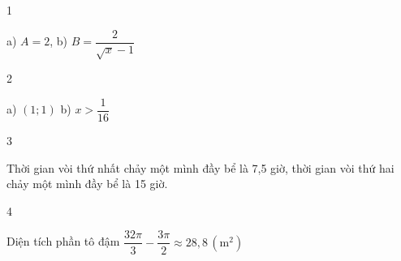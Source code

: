 \begin{Solbook}{1}
 \par \noindent  a) $A=2$, \hspace {2cm} b) $B=\dfrac {2}{\sqrt {x}-1}$  \hfill \qedEX 
\end{Solbook}
\begin{Solbook}{2}
 \par \noindent  a) $(1;1)$ \hspace {2cm} b) $x>\dfrac {1}{16}$  \hfill \qedEX 
\end{Solbook}
\begin{Solbook}{3}
 \par \noindent  Thời gian vòi thứ nhất chảy một mình đầy bể là 7,5 giờ, thời gian vòi thứ hai chảy một mình đầy bể là 15 giờ.  \hfill \qedEX 
\end{Solbook}
\begin{Solbook}{4}
 \par \noindent Diện tích phần tô đậm $\dfrac {32\pi }{3}-\dfrac {3\pi }{2}\approx 28,8\,(\text {m}^2)$  \hfill \qedEX 
\end{Solbook}
